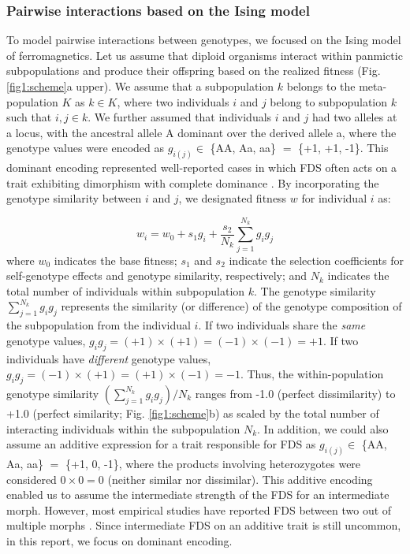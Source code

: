 \documentclass[12pt,]{article}
\begin{document}
\subsubsection{Pairwise interactions based on the Ising model}
To model pairwise interactions between genotypes, we focused on the Ising model of ferromagnetics. Let us assume that diploid organisms interact within panmictic subpopulations and produce their offspring based on the realized fitness (Fig. \ref{fig1:scheme}a upper). We assume that a subpopulation $k$ belongs to the meta-population $K$ as $k \in K$, where two individuals $i$ and $j$ belong to subpopulation $k$ such that $i,j \in k$. We further assumed that individuals $i$ and $j$ had two alleles at a locus, with the ancestral allele A dominant over the derived allele a, where the genotype values were encoded as $g_{i(j)} \in$ \{AA, Aa, aa\} $=$ \{+1, +1, -1\}. This dominant encoding represented well-reported cases in which FDS often acts on a trait exhibiting dimorphism with complete dominance \citep[for example,][]{takahashi2010negative,sato2017herbivore}. By incorporating the genotype similarity between $i$ and $j$, we designated fitness $w$ for individual $i$ as:

\begin{equation}
w_i = w_0 + s_1 g_i + \frac{s_2}{N_k}\sum^{N_{k}}_{j=1}{g_ig_j}\label{eq:1}
\end{equation}
\noindent
where $w_0$ indicates the base fitness; $s_1$ and $s_2$ indicate the selection coefficients for self-genotype effects and genotype similarity, respectively; and $N_k$ indicates the total number of individuals within subpopulation $k$. The genotype similarity $\sum^{N_{k}}_{j=1}{g_ig_j}$ represents the similarity (or difference) of the genotype composition of the subpopulation from the individual $i$. If two individuals share the \textit{same} genotype values, $g_ig_j = (+1)\times(+1) = (-1)\times(-1) = +1$. If two individuals have \textit{different} genotype values, $g_ig_j = (-1)\times(+1) = (+1)\times(-1) = -1$. Thus, the within-population genotype similarity $(\sum^{N_{k}}_{j=1}{g_ig_j})/N_k$ ranges from -1.0 (perfect dissimilarity) to +1.0 (perfect similarity; Fig. \ref{fig1:scheme}b) as scaled by the total number of interacting individuals within the subpopulation $N_k$. In addition, we could also assume an additive expression for a trait responsible for FDS as $g_{i(j)} \in$ \{AA, Aa, aa\} $=$ \{+1, 0, -1\}, where the products involving heterozygotes were considered $0 \times 0 = 0$ (neither similar nor dissimilar). This additive encoding enabled us to assume the intermediate strength of the FDS for an intermediate morph. However, most empirical studies have reported FDS between two out of multiple morphs \citep[e.g.,][]{gigord2001negative,takahashi2010negative,le2015evolutionary,sato2017herbivore,nosil2018natural}. Since intermediate FDS on an additive trait is still uncommon, in this report, we focus on dominant encoding.
\end{document}
